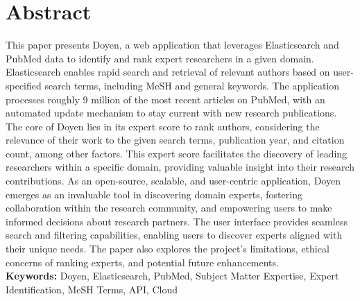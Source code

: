 \section*{Abstract}
This paper presents Doyen, a web application that leverages Elasticsearch and PubMed data to identify and rank expert researchers in a given domain. Elasticsearch enables rapid search and retrieval of relevant authors based on user-specified search terms, including MeSH and general keywords. The application processes roughly 9 million of the most recent articles on PubMed, with an automated update mechanism to stay current with new research publications. The core of Doyen lies in its expert score to rank authors, considering the relevance of their work to the given search terms, publication year, and citation count, among other factors. This expert score facilitates the discovery of leading researchers within a specific domain, providing valuable insight into their research contributions. As an open-source, scalable, and user-centric application, Doyen emerges as an invaluable tool in discovering domain experts, fostering collaboration within the research community, and empowering users to make informed decisions about research partners. The user interface provides seamless search and filtering capabilities, enabling users to discover experts aligned with their unique needs. The paper also explores the project's limitations, ethical concerns of ranking experts, and potential future enhancements.  \\

{\small \textbf{Keywords:} Doyen, Elasticsearch, PubMed, Subject Matter Expertise, Expert Identification, MeSH Terms, API, Cloud }